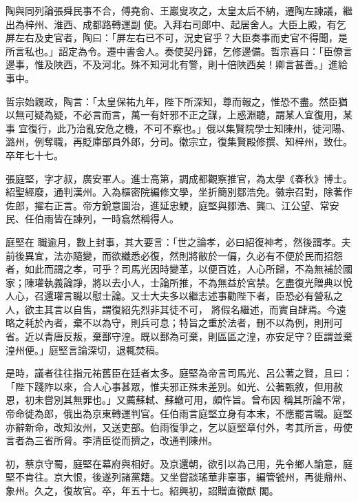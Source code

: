 \begin{pinyinscope}
 陶與同列論張舜民事不合，傅堯俞、王巖叟攻之，太皇太后不納，遷陶左諫議，繼出為梓州、淮西、成都路轉運副
 使。入拜右司郎中、起居舍人。大臣上殿，有乞屏左右及史官者，陶曰：「屏左右已不可，況史官乎？大臣奏事而史官不得聞，是所言私也。」詔定為令。遷中書舍人。奏使契丹歸，乞修邊備。哲宗喜曰：「臣僚言邊事，惟及陜西，不及河北。殊不知河北有警，則十倍陜西矣！卿言甚善。」進給事中。



 哲宗始親政，陶言：「太皇保祐九年，陛下所深知，尊而報之，惟恐不盡。然臣猶以無可疑為疑，不必言而言，萬一有奸邪不正之謀，上惑淵聽，謂某人宜復用，某事
 宜復行，此乃治亂安危之機，不可不察也。」俄以集賢院學士知陳州，徙河陽、潞州，例奪職，再貶庫部員外郎，分司。徽宗立，復集賢殿修撰、知梓州，致仕。卒年七十七。



 張庭堅，字才叔，廣安軍人。進士高第，調成都觀察推官，為太學《春秋》博士。紹聖經廢，通判漢州。入為樞密院編修文學，坐折簡別鄒浩免。徽宗召對，除著作佐郎，擢右正言。帝方銳意圖治，進延忠鯁，庭堅與鄒浩、龔□、江公望、常安民、任伯雨皆在諫列，一時翕然稱得人。



 庭堅在
 職逾月，數上封事，其大要言：「世之論孝，必曰紹復神考，然後謂孝。夫前後異宜，法亦隨變，而欲纖悉必復，然則將敝於一偏，久必有不便於民而招怨者，如此而謂之孝，可乎？司馬光因時變革，以便百姓，人心所歸，不為無補於國家；陳瓘執義論諍，將以去小人，士論所推，不為無益於宮禁。乞盡復光贈典以悅人心，召還瓘言職以慰士論。又士大夫多以繼志述事勸陛下者，臣恐必有營私之人，欲主其言以自售，謂復紹先烈非其徒不可，
 將假名繼述，而實自肆焉。今遠略之耗於內者，棄不以為守，則兵可息；特旨之重於法者，刪不以為例，則刑可省。近以青唐反叛，棄鄯守湟。既以鄯為可棄，則區區之湟，亦安足守？臣謂並棄湟州便。」庭堅言論深切，退輒焚稿。



 是時，議者往往指元祐舊臣在廷者太多。庭堅為帝言司馬光、呂公著之賢，且曰：「陛下踐阼以來，合人心事甚眾，惟夫邪正殊未差別。如光、公著甄敘，但用赦恩，初未嘗別其無罪也。」又薦蘇軾、蘇轍可用，頗忤旨。曾布因
 稱其所論不常，帝命徙為郎，俄出為京東轉運判官。任伯雨言庭堅立身有本末，不應罷言職。庭堅亦辭新命，改知汝州，又送吏部。伯雨復爭之，乞以庭堅章付外，考其所言，毋使言者為三省所脅。李清臣從而擠之，改通判陳州。



 初，蔡京守蜀，庭堅在幕府與相好。及京還朝，欲引以為己用，先令鄉人諭意，庭堅不肯往。京大恨，後遂列諸黨籍。又坐嘗談瑤華非辜事，編管虢州，再徙鼎州、象州。久之，復故官。卒，年五十七。紹興初，詔贈直徽猷
 閣。




\end{pinyinscope}
